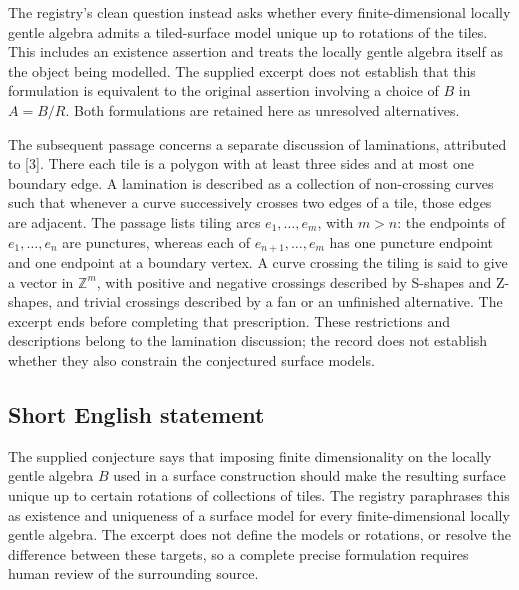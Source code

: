 \documentclass[11pt]{article}
\newcommand{\Z}{\mathbb{Z}}
\begin{document}
The registry's clean question instead asks whether every finite-dimensional locally gentle algebra admits a tiled-surface model unique up to rotations of the tiles. This includes an existence assertion and treats the locally gentle algebra itself as the object being modelled. The supplied excerpt does not establish that this formulation is equivalent to the original assertion involving a choice of \(B\) in \(A=B/R\). Both formulations are retained here as unresolved alternatives.

The subsequent passage concerns a separate discussion of laminations, attributed to [3]. There each tile is a polygon with at least three sides and at most one boundary edge. A lamination is described as a collection of non-crossing curves such that whenever a curve successively crosses two edges of a tile, those edges are adjacent. The passage lists tiling arcs \(e_1,\ldots,e_m\), with \(m>n\): the endpoints of \(e_1,\ldots,e_n\) are punctures, whereas each of \(e_{n+1},\ldots,e_m\) has one puncture endpoint and one endpoint at a boundary vertex. A curve crossing the tiling is said to give a vector in \(\Z^m\), with positive and negative crossings described by S-shapes and Z-shapes, and trivial crossings described by a fan or an unfinished alternative. The excerpt ends before completing that prescription. These restrictions and descriptions belong to the lamination discussion; the record does not establish whether they also constrain the conjectured surface models.
\subsection{Short English statement}
The supplied conjecture says that imposing finite dimensionality on the locally gentle algebra \(B\) used in a surface construction should make the resulting surface unique up to certain rotations of collections of tiles. The registry paraphrases this as existence and uniqueness of a surface model for every finite-dimensional locally gentle algebra. The excerpt does not define the models or rotations, or resolve the difference between these targets, so a complete precise formulation requires human review of the surrounding source.
\end{document}
